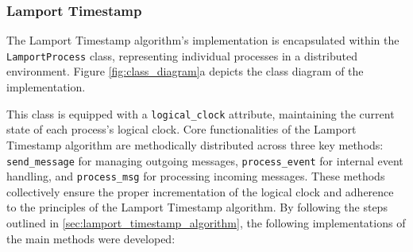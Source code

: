 \documentclass{article}
\begin{document}
    \subsubsection{Lamport Timestamp}
      The Lamport Timestamp algorithm's implementation is encapsulated within the \texttt{LamportProcess} class, representing individual processes in a distributed environment. Figure \ref*{fig:class_diagram}a depicts the class diagram of the implementation.
      
      
      This class is equipped with a \texttt{logical\_clock} attribute, maintaining the current state of each process's logical clock. Core functionalities of the Lamport Timestamp algorithm are methodically distributed across three key methods: \texttt{send\_message} for managing outgoing messages, \texttt{process\_event} for internal event handling, and \texttt{process\_msg} for processing incoming messages. These methods collectively ensure the proper incrementation of the logical clock and adherence to the principles of the Lamport Timestamp algorithm. By following the steps outlined in \ref*{sec:lamport_timestamp_algorithm}, the following implementations of the main methods were developed:
\end{document}
